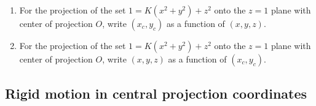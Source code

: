 \documentclass{ximera}
\begin{document}
\begin{problem}\label{31}\hfil
\begin{enumerate}
\item For the projection of the set $1=K\left(x^{2}+y^{2}\right)+z^{2}
  $ onto the $z=1$ plane with center of projection $O$, write $\left(
  x_{c},y_{c}\right)$ as a function of $\left( x,y,z\right) $.
\item For the projection of the set $1=K\left(x^{2}+y^{2}\right)+z^{2} 
$ onto the
  $z=1$ plane with center of projection $O$, write $\left(
  x,y,z\right) $ as a function of $\left( x_{c},y_{c}\right) $.
\end{enumerate}
\end{problem}

\subsection*{Rigid motion in central projection coordinates}
\end{document}
